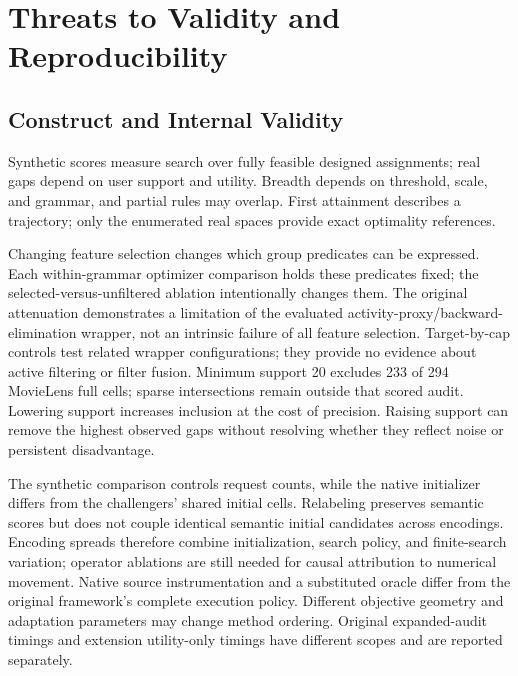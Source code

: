 \section{Threats to Validity and Reproducibility}
\label{sec:validity}

\subsection{Construct and Internal Validity}
Synthetic scores measure search over fully feasible designed assignments; real gaps depend on user support and utility. Breadth depends on threshold, scale, and grammar, and partial rules may overlap. First attainment describes a trajectory; only the enumerated real spaces provide exact optimality references.

Changing feature selection changes which group predicates can be expressed. Each within-grammar optimizer comparison holds these predicates fixed; the selected-versus-unfiltered ablation intentionally changes them. The original attenuation demonstrates a limitation of the evaluated activity-proxy/backward-elimination wrapper, not an intrinsic failure of all feature selection. Target-by-cap controls test related wrapper configurations; they provide no evidence about active filtering or filter fusion. Minimum support 20 excludes 233 of 294 MovieLens full cells; sparse intersections remain outside that scored audit. Lowering support increases inclusion at the cost of precision. Raising support can remove the highest observed gaps without resolving whether they reflect noise or persistent disadvantage.

The synthetic comparison controls request counts, while the native initializer differs from the challengers' shared initial cells. Relabeling preserves semantic scores but does not couple identical semantic initial candidates across encodings. Encoding spreads therefore combine initialization, search policy, and finite-search variation; operator ablations are still needed for causal attribution to numerical movement. Native source instrumentation and a substituted oracle differ from the original framework's complete execution policy. Different objective geometry and adaptation parameters may change method ordering. Original expanded-audit timings and extension utility-only timings have different scopes and are reported separately.

